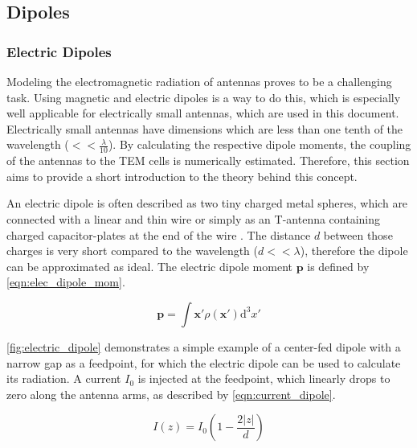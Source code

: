 \subsection{Dipoles}
\subsubsection{Electric Dipoles}

Modeling the electromagnetic radiation of antennas proves to be a challenging task. Using magnetic and electric dipoles is a way to do this, which is especially well applicable for electrically small antennas, which are used in this document. Electrically small antennas have dimensions which are less than one tenth of the wavelength ($<<\frac{\lambda}{10}$)\cite{Balanis_1997}. By calculating the respective dipole moments, the coupling of the antennas to the TEM cells is numerically estimated. Therefore, this section aims to provide a short introduction to the theory behind this concept.

An electric dipole is often described as two tiny charged metal spheres, which are connected with a linear and thin wire\cite{Griffiths_2024} or simply as an T-antenna containing charged capacitor-plates at the end of the wire \cite{Balanis_1997}. The distance $d$ between those charges is very short compared to the wavelength ($d << \lambda$), therefore the dipole can be approximated as ideal\cite{Griffiths_2024}. The electric dipole moment $\mathbf{p}$ is defined by \autoref{eqn:elec_dipole_mom}\cite{Balanis_1997}\cite{Jackson}. %

\begin{equation}
    \mathbf{p} = \int\mathbf{x'} \rho (\mathbf{x'})\mathrm{d}^3x'
    \label{eqn:elec_dipole_mom}
\end{equation}

\autoref{fig:electric_dipole} demonstrates a simple example of a center-fed dipole with a narrow gap as a feedpoint, for which the electric dipole can be used to calculate its radiation\cite{Griffiths_2024}\cite{Jackson}. A current $I_0$ is injected at the feedpoint, which linearly drops to zero along the antenna arms, as described by \autoref{eqn:current_dipole}\cite{Jackson}.

\begin{equation}
    I(z)= I_0\left( 1-\frac{2|z|}{d} \right)
    \label{eqn:current_dipole}
\end{equation}

